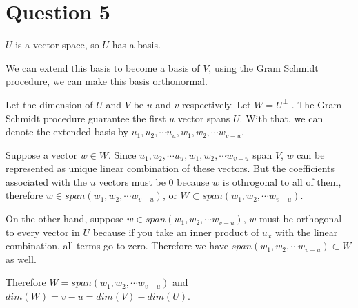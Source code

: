 \section*{Question 5}
$ U $ is a vector space, so $ U $ has a basis.

We can extend this basis to become a basis of $ V $, using the Gram Schmidt procedure, we can make this basis orthonormal.

Let the dimension of $ U  $ and $ V $ be $ u $ and $ v $ respectively. Let $ W = U^\perp $ . The Gram Schmidt procedure guarantee the first $ u $ vector spans $ U $. With that, we can denote the extended basis by $ u_1, u_2, \cdots u_u, w_1, w_2, \cdots w_{v - u} $.

Suppose a vector $ w \in W $. Since $ u_1, u_2, \cdots u_u, w_1, w_2, \cdots w_{v - u} $ span $ V $, $ w $ can be represented as unique linear combination of these vectors. But the coefficients associated with the $ u $ vectors must be 0 because $ w $ is othrogonal to all of them, therefore $ w \in span(w_1, w_2, \cdots w_{v - u}) $, or $ W \subset span(w_1, w_2, \cdots w_{v - u}) $.

On the other hand, suppose $ w \in span(w_1, w_2, \cdots w_{v - u}) $, $ w $ must be orthogonal to every vector in $ U $ because if you take an inner product of $ u_x $ with the linear combination, all terms go to zero. Therefore we have $ span(w_1, w_2, \cdots w_{v - u}) \subset W $ as well.

Therefore $ W = span(w_1, w_2, \cdots w_{v - u}) $ and $ dim(W) = v - u = dim(V) - dim(U) $.